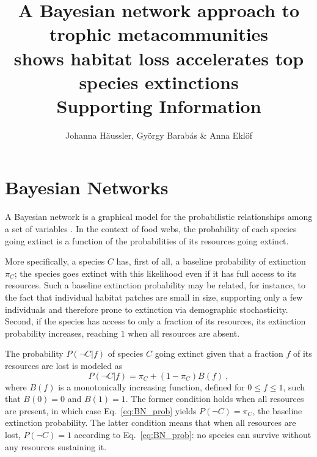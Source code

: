 \documentclass[11pt]{article}
\title{A Bayesian network approach to trophic metacommunities\\shows habitat loss accelerates top species extinctions\\ \medskip Supporting Information}
\author{Johanna H\"aussler, Gy\"orgy Barab\'as \& Anna Ekl\"of}
\date{}
\begin{document}
\maketitle


\section{Bayesian Networks} 
\label{sec:BN}

A Bayesian network is a graphical model for the probabilistic relationships among a set of variables \citep{Jensen1996, Eklofetal2013MEE}. In the context of food webs, the probability of each species going extinct is a function of the probabilities of its resources going extinct.

More specifically, a species $C$ has, first of all, a baseline probability of extinction $\pi_C$; the species goes extinct with this likelihood even if it has full access to its resources. Such a baseline extinction probability may be related, for instance, to the fact that individual habitat patches are small in size, supporting only a few individuals and therefore prone to extinction via demographic stochasticity. Second, if the species has access to only a fraction of its resources, its extinction probability increases, reaching $1$ when all resources are absent. 

The probability $P(\neg C|f)$ of species $C$ going extinct given that a fraction $f$ of its resources are lost is modeled as
\begin{equation}
  \label{eq:BN_prob}
  P(\neg C|f) = \pi_C + (1 - \pi_C) B(f) \ ,
\end{equation}
where $B(f)$ is a monotonically increasing function, defined for $0 \le f \le 1$, such that $B(0)=0$ and $B(1)=1$. The former condition holds when all resources are present, in which case Eq.~\ref{eq:BN_prob} yields $P(\neg C) = \pi_C$, the baseline extinction probability. The latter condition means that when all resources are lost, $P(\neg C) = 1$ according to Eq.~\ref{eq:BN_prob}: no species can survive without any resources sustaining it.
\end{document}
